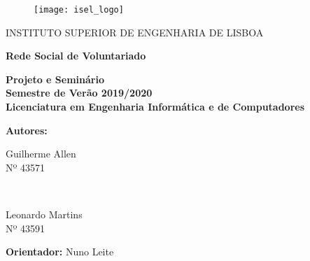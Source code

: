 {\centering
	
	\begin{figure}[t!]
		\texttt{[image: isel\_logo]}	
		\centering
	\end{figure}
	
	
	\centerline{\LARGE{INSTITUTO SUPERIOR DE ENGENHARIA DE LISBOA}}
	\bigskip
	\bigskip
	
	{ \huge \bfseries Rede Social de Voluntariado}
	\bigskip\bigskip
	
	\textbf{
		Projeto e Seminário\\
		Semestre de Verão 2019/2020\\
		Licenciatura em Engenharia Informática e de Computadores
	}
	\bigskip
	\bigskip
	
	\large \textbf{Autores:}
	\bigskip
	
	\begin{minipage}{0.4\textwidth}
		\begin{flushleft} 
			Guilherme Allen\\
			Nº 43571\\
		\end{flushleft}
	\end{minipage}
	~	
	\begin{minipage}{0.4\textwidth}
		\begin{flushright} 
			Leonardo Martins\\ 
			Nº 43591\\
		\end{flushright}
	\end{minipage}
	\bigskip
	\bigskip
	
	\large \textbf{Orientador:} Nuno Leite
	
}